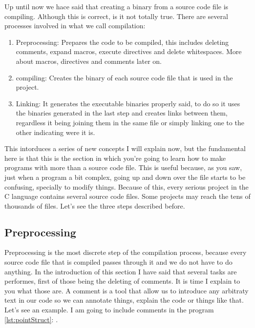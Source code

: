 \documentclass[a4paper]{article}
\begin{document}
Up until now we hace said that creating a binary from a source code file is
compiling. Although this is correct, is it not totally true. There are several
processes involved in what we call compilation:
\begin{enumerate}
\item Preprocessing: Prepares the code to be compiled, this includes deleting
comments, expand macros, execute directives and delete whitespaces. More about
macros, directives and comments later on.
\item compiling: Creates the binary of each source code file that is used in
the project.
\item Linking: It generates the executable binaries properly said, to do so it
uses the binaries generated in the last step and creates links between them,
regardless it being joining them in the same file or simply linking one to the
other indicating were it is.
\end{enumerate}

This intorduces a series of new concepts I will explain now, but the fundamental
here is that this is the section in which you're going to learn how to make
programs with more than a source code file. This is useful because, as you saw,
just when a program a bit complex, going up and down over the file starts to be
confusing, specially to modify things. Because of this, every serious project
in the C language contains several source code files. Some projects may reach
the tens of thousands of files. Let's see the three steps described before.

\subsection{Preprocessing}

Preprocessing is the most discrete step of the compilation process, because
every source code file that is compiled passes through it and we do not have to
do anything. In the introduction of this section I have said that several tasks
are performes, first of those being the deleting of comments. It is time I
explain to you what those are. A comment is a tool that allow us to introduce
any arbitraty text in our code so we can annotate things, explain the code or
things like that. Let's see an example. I am going to include comments in the
program \ref {lst:pointStruct}: .
\end{document}
